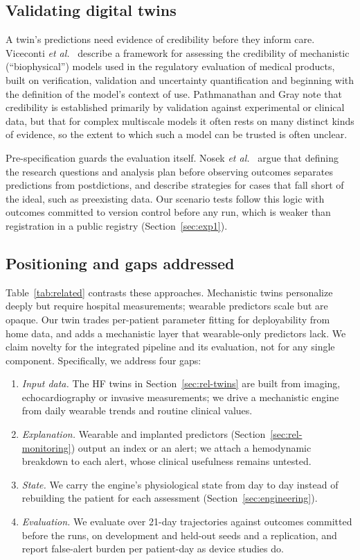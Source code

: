 \documentclass[conference]{IEEEtran}
\begin{document}
\subsection{Validating digital twins}\label{sec:rel-validation}
A twin's predictions need evidence of credibility before they inform care. Viceconti \textit{et al.}\ \cite{viceconti2021insilico} describe a framework for assessing the credibility of mechanistic (``biophysical'') models used in the regulatory evaluation of medical products, built on verification, validation and uncertainty quantification and beginning with the definition of the model's context of use. Pathmanathan and Gray \cite{pathmanathan2018validation} note that credibility is established primarily by validation against experimental or clinical data, but that for complex multiscale models it often rests on many distinct kinds of evidence, so the extent to which such a model can be trusted is often unclear.

Pre-specification guards the evaluation itself. Nosek \textit{et al.}\ \cite{nosek2018prereg} argue that defining the research questions and analysis plan before observing outcomes separates predictions from postdictions, and describe strategies for cases that fall short of the ideal, such as preexisting data. Our scenario tests follow this logic with outcomes committed to version control before any run, which is weaker than registration in a public registry (Section~\ref{sec:exp1}).

\subsection{Positioning and gaps addressed}\label{sec:rel-gaps}
Table~\ref{tab:related} contrasts these approaches. Mechanistic twins personalize deeply but require hospital measurements; wearable predictors scale but are opaque. Our twin trades per-patient parameter fitting for deployability from home data, and adds a mechanistic layer that wearable-only predictors lack. We claim novelty for the integrated pipeline and its evaluation, not for any single component. Specifically, we address four gaps:
\begin{enumerate}
\item \emph{Input data.} The HF twins in Section~\ref{sec:rel-twins} are built from imaging, echocardiography or invasive measurements; we drive a mechanistic engine from daily wearable trends and routine clinical values.
\item \emph{Explanation.} Wearable and implanted predictors (Section~\ref{sec:rel-monitoring}) output an index or an alert; we attach a hemodynamic breakdown to each alert, whose clinical usefulness remains untested.
\item \emph{State.} We carry the engine's physiological state from day to day instead of rebuilding the patient for each assessment (Section~\ref{sec:engineering}).
\item \emph{Evaluation.} We evaluate over 21-day trajectories against outcomes committed before the runs, on development and held-out seeds and a replication, and report false-alert burden per patient-day as device studies do.
\end{enumerate}
\end{document}
